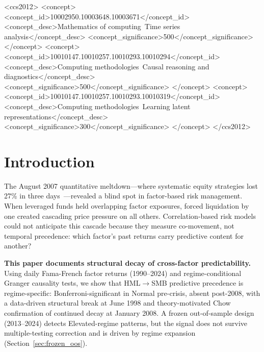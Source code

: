 \documentclass[sigconf,anonymous]{acmart}
\begin{document}
\begin{CCSXML}
<ccs2012>
   <concept>
       <concept_id>10002950.10003648.10003671</concept_id>
       <concept_desc>Mathematics of computing~Time series analysis</concept_desc>
       <concept_significance>500</concept_significance>
   </concept>
   <concept>
       <concept_id>10010147.10010257.10010293.10010294</concept_id>
       <concept_desc>Computing methodologies~Causal reasoning and diagnostics</concept_desc>
       <concept_significance>500</concept_significance>
   </concept>
   <concept>
       <concept_id>10010147.10010257.10010293.10010319</concept_id>
       <concept_desc>Computing methodologies~Learning latent representations</concept_desc>
       <concept_significance>300</concept_significance>
   </concept>
</ccs2012>
\end{CCSXML}



\maketitle

\section{Introduction}

The August 2007 quantitative meltdown---where systematic equity strategies
lost 27\% in three days~\cite{khandani2011quants}---revealed a blind spot
in factor-based risk management. When leveraged funds held overlapping factor
exposures, forced liquidation by one created cascading price pressure on all
others. Correlation-based risk models could not anticipate this cascade because
they measure co-movement, not temporal precedence: which factor's past
returns carry predictive content for another?

\textbf{This paper documents structural decay of cross-factor predictability.}
Using daily Fama-French factor returns (1990--2024) and regime-conditional
Granger causality tests, we show that HML$\to$SMB predictive precedence
is regime-specific: Bonferroni-significant in Normal pre-crisis, absent
post-2008, with a data-driven structural break at June 1998 and
theory-motivated Chow confirmation of continued decay at January 2008.
A frozen out-of-sample design (2013--2024) detects Elevated-regime
patterns, but the signal does not survive multiple-testing correction
and is driven by regime expansion (Section~\ref{sec:frozen_oos}).
\end{document}
